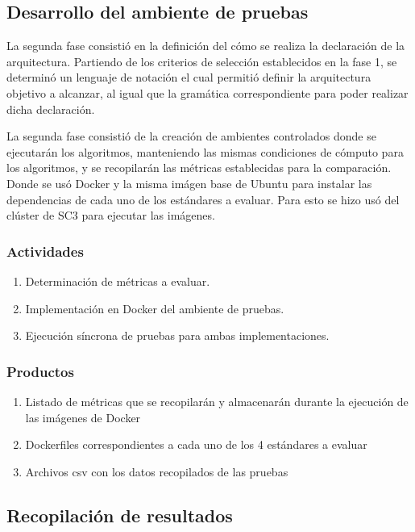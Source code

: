 \subsection{Desarrollo del ambiente de pruebas}

La segunda fase consistió en la definición del cómo se realiza la declaración de la arquitectura. Partiendo de los criterios de selección establecidos en la fase 1, se determinó un lenguaje de notación el cual permitió definir la arquitectura objetivo a alcanzar, al igual que la gramática correspondiente para poder realizar dicha declaración.

La segunda fase consistió de la creación de ambientes controlados donde se ejecutarán los algoritmos, manteniendo las mismas condiciones de cómputo para los algoritmos, y se recopilarán las métricas establecidas para la comparación. Donde se usó Docker y la misma imágen base de Ubuntu para instalar las dependencias de cada uno de los estándares a evaluar. Para esto se hizo usó del clúster de SC3 para ejecutar las imágenes.

\subsubsection*{Actividades}

\begin{enumerate}
	\itemsep-2mm
	\item Determinación de métricas a evaluar.
	\item Implementación en Docker del ambiente de pruebas.
	\item Ejecución síncrona de pruebas para ambas implementaciones.
\end{enumerate}

\subsubsection*{Productos}

\begin{enumerate}
	\itemsep-2mm
	\item Listado de métricas que se recopilarán y almacenarán durante la ejecución de las imágenes de Docker
	\item Dockerfiles correspondientes a cada uno de los 4 estándares a evaluar
	\item Archivos csv con los datos recopilados de las pruebas
\end{enumerate}

\subsection{Recopilación de resultados}

